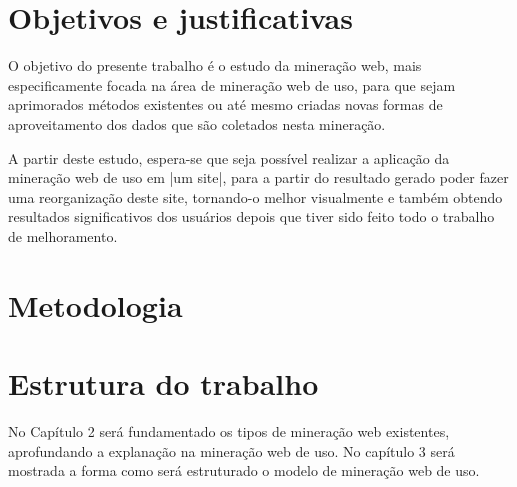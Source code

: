 \section{Objetivos e justificativas}

    O objetivo do presente trabalho é o estudo da mineração web, mais especificamente focada na área de mineração web de uso, para que sejam aprimorados métodos existentes ou até mesmo criadas novas formas de aproveitamento dos dados que são coletados nesta mineração.

    A partir deste estudo, espera-se que seja possível realizar a aplicação da mineração web de uso em |um site|, para a partir do resultado gerado poder fazer uma reorganização deste site, tornando-o melhor visualmente e também obtendo resultados significativos dos usuários depois que tiver sido feito todo o trabalho de melhoramento.


\section{Metodologia}


\section{Estrutura do trabalho}
    No Capítulo 2 será fundamentado os tipos de mineração web existentes, aprofundando a explanação na mineração web de uso. No capítulo 3 será mostrada a forma como será estruturado o modelo de mineração web de uso.

